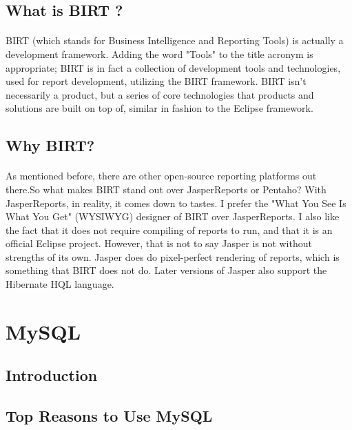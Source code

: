 \subsection{What is BIRT ?}
\paragraph{}
BIRT (which stands for Business Intelligence and Reporting Tools) is actually a development framework. Adding the word "Tools" to the title acronym is appropriate; BIRT is in fact a collection of development tools and technologies, used for report development, utilizing the BIRT framework. BIRT isn't necessarily a product, but a series of core technologies that products and solutions are built on top of, similar in fashion to the Eclipse framework.

\subsection{Why BIRT?}
\paragraph{}
As mentioned before, there are other open-source reporting platforms out there.So what makes BIRT stand out over JasperReports or Pentaho? With JasperReports, in reality, it comes down to tastes. I prefer the "What You See Is What You Get" (WYSIWYG) designer of BIRT over JasperReports. I also like the fact that it does not require compiling of reports to run, and that it is an official Eclipse project. However, that is not to say Jasper is not without strengths of its own. Jasper does do pixel-perfect rendering of reports, which is something that BIRT does not do. Later
versions of Jasper also support the Hibernate HQL language.

\section{MySQL}
\subsection{Introduction}
\subsection{Top Reasons to Use MySQL}

